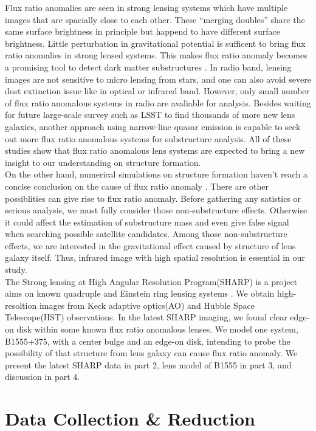 \documentclass[manuscript]{emulateapj}
\begin{document}
	Flux ratio anomalies are seen in strong lensing systems which have multiple images that are spacially close to each other. These ``merging doubles'' share the same surface brightness in principle but happend to have different surface brightness. Little perturbation in gravitational potential is sufficent to bring flux ratio anomalies in strong lensed systems. This makes flux ratio anomaly becomes a promising tool to detect dark matter substructures \citep{Dalal2002, N13}. In radio band, lensing images are not sensitive to micro lensing from stars, and one can also avoid severe dust extinction issue like in optical or infrared band. However, only small number of flux ratio anomalous systems in radio are avaliable for analysis. Besides waiting for future large-scale survey such as LSST to find thousands of more new lens galaxies, another approach using narrow-line quasar emission \citep{N14} is capable to seek out more flux ratio anomalous systems for substructure analysis. All of these studies show that flux ratio anomalous lens systems are expected to bring a new insight to our understanding on structure formation.\\
	On the other hand, numerical simulations on structure formation haven't reach a concise conclusion on the cause of flux ratio anomaly \citep{Xu14}. There are other possiblities can give rise to flux ratio anomaly. Before gathering any satistics or serious analysis, we must fully consider those non-substructure effects. Otherwise it could affect the estimation of substructure mass and even give false signal when searching possible satellite candidates. Among those non-substructure effects, we are interested in the gravitational effect caused by structure of lens galaxy itself. Thus, infrared image with high spatial resolution is essential in our study.\\
	The Strong lensing at High Angular Resolution Program(SHARP) is a project aims on known quadruple and Einstein ring lensing systems \citep{SHARP12}. We obtain high-resoltion images from Keck adaptive optics(AO) and Hubble Space Telescope(HST) observations. In the latest SHARP imaging, we found clear edge-on disk within some known flux ratio anomalous lenses. We model one system, B1555+375, with a center bulge and an edge-on disk, intending to probe the possibility of that structure from lens galaxy can cause flux ratio anomaly. We present the latest SHARP data in part 2, lens model of B1555 in part 3, and discussion in part 4. 

\section{Data Collection \& Reduction}
\end{document}
